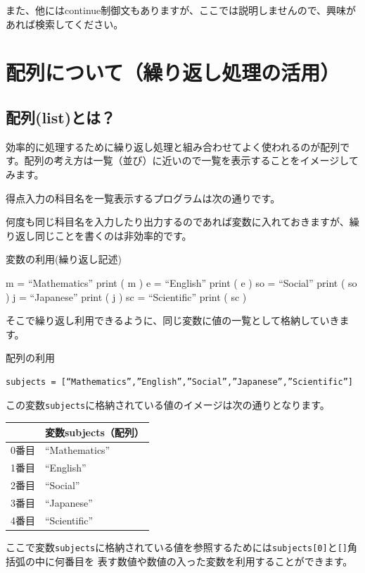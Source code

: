 \documentclass[11pt,a4paper,dvipdfmx,titlepage]{jsreport}
\begin{document}
また、他にはcontinue制御文もありますが、ここでは説明しませんので、興味があれば検索してください。

\section{配列について（繰り返し処理の活用）}

\subsection{配列(list)とは？}

効率的に処理するために繰り返し処理と組み合わせてよく使われるのが配列です。配列の考え方は一覧（並び）に近いので一覧を表示することをイメージしてみます。

得点入力の科目名を一覧表示するプログラムは次の通りです。

何度も同じ科目名を入力したり出力するのであれば変数に入れておきますが、繰り返し同じことを書くのは非効率的です。
\newpage
\begin{grabox}{変数の利用(繰り返し記述)}
\begin{listing}{1}
m = “Mathematics”
print ( m )
e = “English”
print ( e )
so = “Social”
print ( so )
j = “Japanese”
print ( j )
sc = “Scientific”
print ( sc )
\end{listing}
\end{grabox}

そこで繰り返し利用できるように、同じ変数に値の一覧として格納していきます。
\begin{grabox}{配列の利用}
\begin{verbatim}
subjects = [“Mathematics”,”English”,”Social”,”Japanese”,”Scientific”]
\end{verbatim}
この変数{\tt subjects}に格納されている値のイメージは次の通りとなります。
 \begin{center}
\begin{tabular}{|c|p{5cm}|} \hline
      & 変数subjects（配列）       \\ \hline \hline
0番目  & “Mathematics”  \\ \hline
1番目  & “English”      \\ \hline
2番目  & “Social”       \\ \hline
3番目  & “Japanese”     \\ \hline
4番目  & “Scientific”   \\ \hline
\end{tabular}
\end{center}
\end{grabox}
ここで変数{\tt subjects}に格納されている値を参照するためには{\tt subjects[0]}と{\tt []}角括弧の中に何番目を
表す数値や数値の入った変数を利用することができます。
\end{document}
